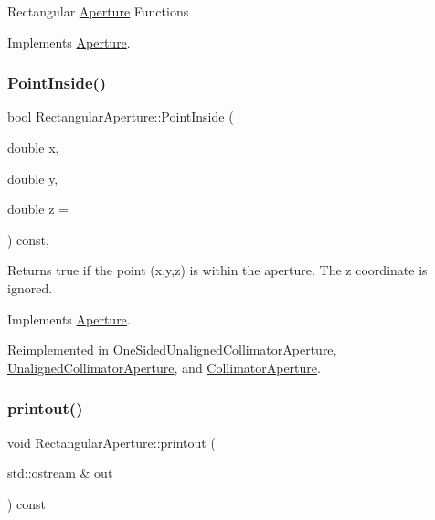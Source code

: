 Rectangular \hyperlink{classAperture}{Aperture} Functions 

Implements \hyperlink{classAperture_ad0ea7907d393ec1e6a8303343fe9dd29}{Aperture}.

\mbox{\label{classRectangularAperture_a47e965df14eb63f2a3851ea0e9fe26db}} 
\subsubsection{\texorpdfstring{Point\+Inside()}{PointInside()}}
{\footnotesize\ttfamily bool Rectangular\+Aperture\+::\+Point\+Inside (\begin{DoxyParamCaption}\item[{double}]{x,  }\item[{double}]{y,  }\item[{double}]{z = {} }\end{DoxyParamCaption}) const\hspace{0.3cm}{\ttfamily [inline]}, {\ttfamily [virtual]}}

Returns true if the point (x,y,z) is within the aperture. The z coordinate is ignored. 

Implements \hyperlink{classAperture_a77854d058bf8a00cfeb7a6d766dc0028}{Aperture}.



Reimplemented in \hyperlink{classOneSidedUnalignedCollimatorAperture_afad818345b971dffa9ca6fa36a166e35}{One\+Sided\+Unaligned\+Collimator\+Aperture}, \hyperlink{classUnalignedCollimatorAperture_af116c2ff1d60c4894a9b9ae4cfc2b19e}{Unaligned\+Collimator\+Aperture}, and \hyperlink{classCollimatorAperture_a964f63287a0ab48900859d75dfa644dc}{Collimator\+Aperture}.

\mbox{\label{classRectangularAperture_ab3a9514337b3fd3f2368f03ab6410533}} 
\subsubsection{\texorpdfstring{printout()}{printout()}}
{\footnotesize\ttfamily void Rectangular\+Aperture\+::printout (\begin{DoxyParamCaption}\item[{std\+::ostream \&}]{out }\end{DoxyParamCaption}) const\hspace{0.3cm}{\ttfamily [virtual]}}

